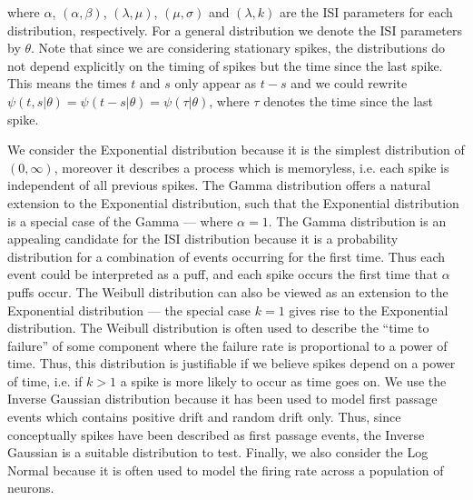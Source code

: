 \documentclass[../main.tex]{subfiles}
\begin{document}
 where $\alpha$, $(\alpha, \beta)$, $(\lambda , \mu)$, $(\mu, \sigma)$ and $(\lambda, k)$ are the ISI parameters for each distribution, respectively. For a general distribution we denote the ISI parameters by $\theta$. Note that since we are considering stationary spikes, the distributions do not depend explicitly on the timing of spikes but the time since the last spike. This means the times $t$ and $s$ only appear as $t-s$ and we could rewrite $\psi(t,s| \theta) = \psi(t-s| \theta) = \psi(\tau| \theta) $, where $\tau$ denotes the time since the last spike.
 
 We consider the Exponential distribution because it is the simplest distribution of $(0,\infty)$, moreover it describes a process which is memoryless, i.e. each spike is independent of all previous spikes. The Gamma distribution offers a natural extension to the Exponential distribution, such that the Exponential distribution is a special case of the Gamma --- where $\alpha = 1$. The Gamma distribution is an appealing candidate for the ISI distribution because it is a probability distribution for a combination of events occurring for the first time. Thus each event could be interpreted as a  puff, and each spike occurs the first time that $\alpha$ puffs occur.  
 	The Weibull distribution can also be viewed as an extension to the Exponential distribution --- the special case $k=1$ gives rise to the Exponential distribution. The Weibull distribution is often used to describe the ``time to failure'' of some component where the failure rate is proportional to a power of time. Thus, this distribution is justifiable if we believe  spikes depend on a power of time, i.e. if $k >1$ a spike is more likely to occur as time goes on. 
 	We use the Inverse Gaussian distribution because it has been used to model first passage events which contains positive drift and random drift only. Thus, since conceptually  spikes have been described as first passage events, the Inverse Gaussian is a suitable distribution to test. 
 	Finally, we also consider the  Log Normal because it is often used to model the firing rate across a population of neurons.  
 	 


\end{document}
